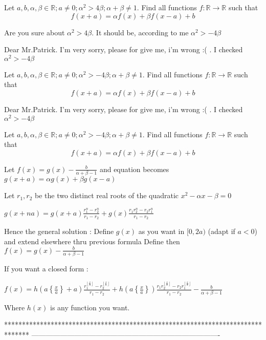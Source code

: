 \begin{solution}
	\begin{tcolorbox}Let $a,b,\alpha, \beta \in \mathbb{R}; a\neq 0;\alpha^2> 4\beta ;\alpha+ \beta \neq 1$. Find all functions $f:\mathbb{R}\to\mathbb{R}$ such that 
\[f(x+a)=\alpha f(x)+\beta f(x-a)+b\]\end{tcolorbox}
Are you sure about $\alpha^2>4\beta$. It should be, according to me $\alpha^2>-4\beta$
\end{solution}



\begin{solution}
	Dear Mr.Patrick. I'm very sorry, please for give me, i'm wrong :( . I checked $\alpha^2>-4\beta$

Let $a,b,\alpha, \beta \in \mathbb{R}; a\neq 0;\alpha^2>- 4\beta ;\alpha+ \beta \neq 1$. Find all functions $f:\mathbb{R}\to\mathbb{R}$ such that 
\[f(x+a)=\alpha f(x)+\beta f(x-a)+b\]
\end{solution}



\begin{solution}
	\begin{tcolorbox}Dear Mr.Patrick. I'm very sorry, please for give me, i'm wrong :( . I checked $\alpha^2>-4\beta$

Let $a,b,\alpha, \beta \in \mathbb{R}; a\neq 0;\alpha^2>- 4\beta ;\alpha+ \beta \neq 1$. Find all functions $f:\mathbb{R}\to\mathbb{R}$ such that 
\[f(x+a)=\alpha f(x)+\beta f(x-a)+b\]\end{tcolorbox}
Let $f(x)=g(x)-\frac b{\alpha+\beta-1}$ and equation becomes $g(x+a)=\alpha g(x)+\beta g(x-a)$

Let $r_1,r_2$ be the two distinct real roots of the quadratic $x^2-\alpha x-\beta=0$

$g(x+na)=g(x+a)\frac{r_1^n-r_2^n}{r_1-r_2}+g(x)\frac{r_1r_2^n-r_2r_1^n}{r_1-r_2}$

Hence the general solution : 
Define $g(x)$ as you want in $[0,2a)$ (adapt if $a<0$) and extend elsewhere thru previous formula
Define then $f(x)=g(x)-\frac b{\alpha+\beta-1}$

If  you want a closed form :

$f(x)=h(a\left\{\frac xa\right\}+a)\frac{r_1^{\left\lfloor\frac xa\right\rfloor}-r_2^{\left\lfloor\frac xa\right\rfloor}}{r_1-r_2}+h(a\left\{\frac xa\right\})\frac{r_1r_2^{\left\lfloor\frac xa\right\rfloor}-r_2r_1^{\left\lfloor\frac xa\right\rfloor}}{r_1-r_2}-\frac b{\alpha+\beta-1}$

Where $h(x)$ is any function you want.
\end{solution}
*******************************************************************************
-------------------------------------------------------------------------------

